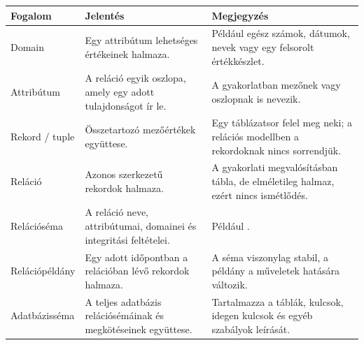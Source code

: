 \begin{tabularx}{\textwidth}{L{31mm}X X}
\toprule
\textbf{Fogalom} & \textbf{Jelentés} & \textbf{Megjegyzés} \\
\midrule
Domain & Egy attribútum lehetséges értékeinek halmaza. & Például egész számok, dátumok, nevek vagy egy felsorolt értékkészlet. \\
Attribútum & A reláció egyik oszlopa, amely egy adott tulajdonságot ír le. & A gyakorlatban mezőnek vagy oszlopnak is nevezik. \\
Rekord / tuple & Összetartozó mezőértékek együttese. & Egy táblázatsor felel meg neki; a relációs modellben a rekordoknak nincs sorrendjük. \\
Reláció & Azonos szerkezetű rekordok halmaza. & A gyakorlati megvalósításban tábla, de elméletileg halmaz, ezért nincs ismétlődés. \\
Relációséma & A reláció neve, attribútumai, domainei és integritási feltételei. & Például . \\
Relációpéldány & Egy adott időpontban a relációban lévő rekordok halmaza. & A séma viszonylag stabil, a példány a műveletek hatására változik. \\
Adatbázisséma & A teljes adatbázis relációsémáinak és megkötéseinek együttese. & Tartalmazza a táblák, kulcsok, idegen kulcsok és egyéb szabályok leírását. \\
\bottomrule
\end{tabularx}
